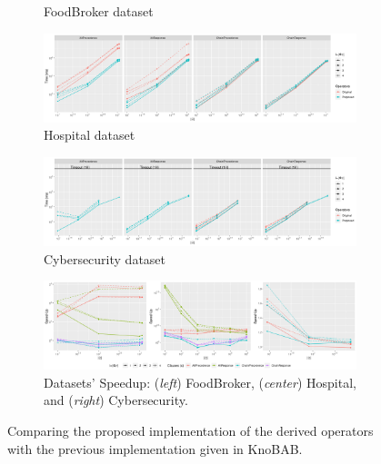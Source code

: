 \documentclass[sigconf]{acmart}
\begin{document}
\begin{figure}[!p]
\begin{subfigure}{\textwidth}
\caption{FoodBroker dataset}
\end{subfigure}
\begin{subfigure}{\textwidth}
\centering
\includegraphics[width=\textwidth]{images/Hospital.png}
\caption{Hospital dataset}
\end{subfigure}
\begin{subfigure}{\textwidth}
\centering
\includegraphics[width=\textwidth]{images/Cyber.png}
\caption{Cybersecurity dataset}
\end{subfigure}
\begin{subfigure}{\textwidth}
\centering
\includegraphics[width=\textwidth]{images/Speedups.png}
\caption{Datasets' Speedup: (\textit{left}) FoodBroker, (\textit{center}) Hospital, and (\textit{right}) Cybersecurity.}
\end{subfigure}
\caption{Comparing the proposed implementation of the derived operators with the previous implementation given in KnoBAB. }\label{overallBenchmarks}
\end{figure}
\end{document}
